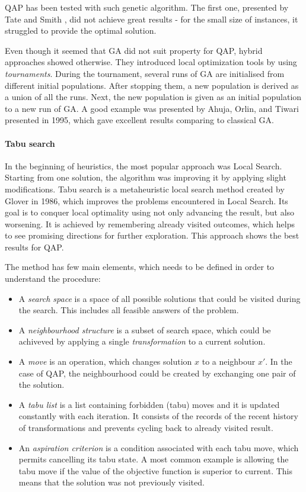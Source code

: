 \documentclass[english,a4paper,twoside]{ppfcmthesis}
\begin{document}
QAP has been tested with such genetic algorithm.
The first one, presented by Tate and Smith \cite{tate1995genetic}, did not achieve great results - for the small size of instances, it struggled to provide the optimal solution.

Even though it seemed that GA did not suit property for QAP, hybrid approaches showed otherwise.
They introduced local optimization tools by using \textit{tournaments}.
During the tournament, several runs of GA are initialised from different initial populations.
After stopping them, a new population is derived as a union of all the runs.
Next, the new population is given as an initial population to a new run of GA.
A good example was presented by Ahuja, Orlin, and Tiwari \cite{ahuja2000greedy} presented in 1995, which gave excellent results comparing to classical GA.

\paragraph{Tabu search}

In the beginning of heuristics, the most popular approach was Local Search.
Starting from one solution, the algorithm was improving it by applying slight modifications.
Tabu search is a metaheuristic local search method created by Glover \cite{glover1986future} in 1986, which improves the problems encountered in Local Search.
Its goal is to conquer local optimality using not only advancing the result, but also worsening.
It is achieved by remembering already visited outcomes, which helps to see promising directions for further exploration.
This approach shows the best results for QAP.

The method has few main elements, which needs to be defined in order to understand the procedure:
\begin{itemize}
  \item A \textit{search space} is a space of all possible solutions that could be visited during the search. This includes all feasible answers of the problem.
  \item A \textit{neighbourhood structure} is a subset of search space, which could be achiveved by applying a single \textit{transformation} to a current solution.
  \item A \textit{move} is an operation, which changes solution $x$ to a neighbour $x'$. In the case of QAP, the neighbourhood could be created by exchanging one pair of the solution.
  \item A \textit{tabu list} is a list containing forbidden (tabu) moves and it is updated constantly with each iteration. It consists of the records of the recent history of transformations and prevents cycling back to already visited result.
  \item An \textit{aspiration criterion} is a condition associated with each tabu move, which permits cancelling its tabu state. A most common example is allowing the tabu move if the value of the objective function is superior to current. This means that the solution was not previously visited.
\end{itemize}
\end{document}
